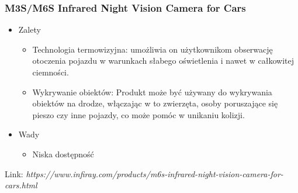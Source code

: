         \subsubsection*{M3S/M6S Infrared Night Vision Camera for Cars} %
        \begin{itemize}
            \item Zalety
            \begin{itemize}
                \item Technologia termowizyjna: umożliwia on użytkownikom obserwację otoczenia pojazdu 
                w warunkach słabego oświetlenia i nawet w całkowitej ciemności.
                \item Wykrywanie obiektów: Produkt może być używany do wykrywania obiektów na drodze, 
                włączając w to zwierzęta, osoby poruszające się pieszo czy inne pojazdy, 
                co może pomóc w unikaniu kolizji.
            \end{itemize}
            \item Wady
            \begin{itemize}
                \item Niska dostępność
            \end{itemize}
        \end{itemize}

        Link: \textit{https://www.infiray.com/products/m6s-infrared-night-vision-camera-for-cars.html}
